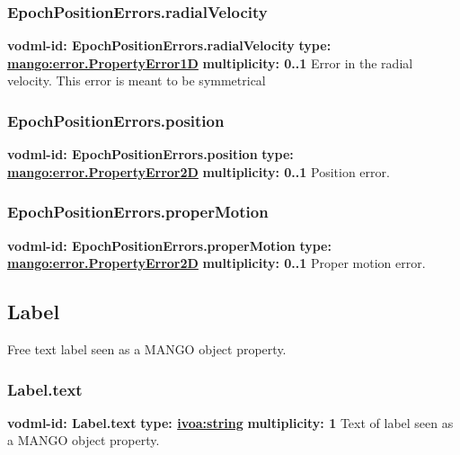     \subsubsection{EpochPositionErrors.radialVelocity}
      \textbf{vodml-id: EpochPositionErrors.radialVelocity} \newline
      \textbf{type: \hyperref[sect:error.PropertyError1D]{mango:error.PropertyError1D}} \newline
      \textbf{multiplicity: 0..1} \newline 
      Error in the radial velocity. This error is meant to be symmetrical

    \subsubsection{EpochPositionErrors.position}
      \textbf{vodml-id: EpochPositionErrors.position} \newline
      \textbf{type: \hyperref[sect:error.PropertyError2D]{mango:error.PropertyError2D}} \newline
      \textbf{multiplicity: 0..1} \newline 
      Position error.

    \subsubsection{EpochPositionErrors.properMotion}
      \textbf{vodml-id: EpochPositionErrors.properMotion} \newline
      \textbf{type: \hyperref[sect:error.PropertyError2D]{mango:error.PropertyError2D}} \newline
      \textbf{multiplicity: 0..1} \newline 
      Proper motion error.

  \subsection{Label}
  \label{sect:Label}
    Free text label seen as a MANGO object property.

    \subsubsection{Label.text}
      \textbf{vodml-id: Label.text} \newline
      \textbf{type: \hyperref[sect:ivoa]{ivoa:string}} \newline
      \textbf{multiplicity: 1} \newline 
      Text of label seen as a MANGO object property.

